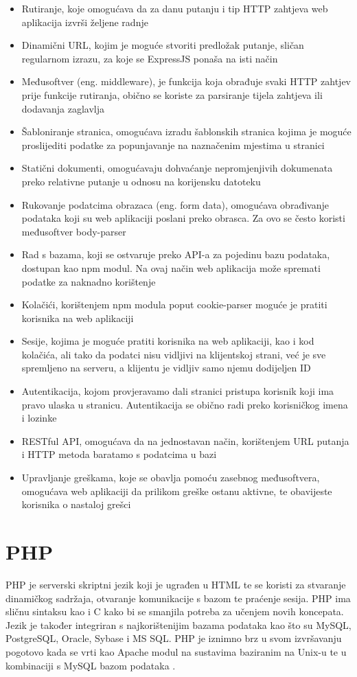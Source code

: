 \documentclass[12pt, oneside, onecolumn]{book}
\begin{document}
{\begin{itemize}
\item Rutiranje, koje omogućava da za danu putanju i tip HTTP zahtjeva web aplikacija izvrši željene radnje
\item Dinamični URL, kojim je moguće stvoriti predložak putanje, sličan regularnom izrazu, za koje se ExpressJS ponaša na isti način
\item Međusoftver (eng. middleware), je funkcija koja obrađuje svaki HTTP zahtjev prije funkcije rutiranja, obično se koriste za parsiranje tijela zahtjeva ili dodavanja zaglavlja
\item Šabloniranje stranica, omogućava izradu šablonskih stranica kojima je moguće proslijediti podatke za popunjavanje na naznačenim mjestima u stranici
\item Statični dokumenti, omogućavaju dohvaćanje nepromjenjivih dokumenata preko relativne putanje u odnosu na korijensku datoteku
\item Rukovanje podatcima obrazaca (eng. form data), omogućava obrađivanje podataka koji su web aplikaciji poslani preko obrasca. Za ovo se često koristi međusoftver body-parser
\item Rad s bazama, koji se ostvaruje preko API-a za pojedinu bazu podataka, dostupan kao npm modul. Na ovaj način web aplikacija može spremati podatke za naknadno korištenje
\item Kolačići, korištenjem npm modula poput cookie-parser moguće je pratiti korisnika na web aplikaciji
\item Sesije, kojima je moguće pratiti korisnika na web aplikaciji, kao i kod kolačića, ali tako da podatci nisu vidljivi na klijentskoj strani, već je sve spremljeno na serveru, a klijentu je vidljiv samo njemu dodijeljen ID
\item Autentikacija, kojom provjeravamo dali stranici pristupa korisnik koji ima pravo ulaska u stranicu. Autentikacija se obično radi preko korisničkog imena i lozinke
\item RESTful API, omogućava da na jednostavan način, korištenjem URL putanja i HTTP metoda baratamo s podatcima u bazi
\item Upravljanje greškama, koje se obavlja pomoću zasebnog međusoftvera, omogućava web aplikaciji da prilikom greške ostanu aktivne, te obavijeste korisnika o nastaloj grešci
\end{itemize}

\section{PHP}
PHP je serverski skriptni jezik koji je ugrađen u HTML te se koristi za stvaranje dinamičkog sadržaja, otvaranje komunikacije s bazom te praćenje sesija. PHP ima sličnu sintaksu kao i C kako bi se smanjila potreba za učenjem novih koncepata. Jezik je također integriran s najkorištenijim bazama podataka kao što su MySQL, PostgreSQL, Oracle, Sybase i MS SQL. PHP je iznimno brz u svom izvršavanju pogotovo kada se vrti kao Apache modul na sustavima baziranim na Unix-u te u kombinaciji s MySQL bazom podataka \cite{php}.

}
\end{document}
